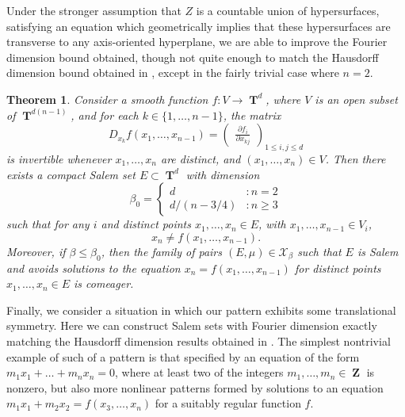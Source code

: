 \documentclass[dvipsnames,letterpaper,12pt]{article}
\numberwithin{equation}{section}
\DeclareMathOperator{\ZZ}{\mathbf{Z}}
\DeclareMathOperator{\TT}{\mathbf{T}}
\newtheorem{theorem}{Theorem}
\numberwithin{theorem}{section}
\begin{document}
Under the stronger assumption that $Z$ is a countable union of hypersurfaces, satisfying an equation which geometrically implies that these hypersurfaces are transverse to any axis-oriented hyperplane, we are able to improve the Fourier dimension bound obtained, though not quite enough to match the Hausdorff dimension bound obtained in \cite{PramanikFraser}, except in the fairly trivial case where $n = 2$.

\begin{theorem} \label{theoremJOICVIOJVI122}
    Consider a smooth function $f: V \to \TT^d$, where $V$ is an open subset of $\TT^{d(n-1)}$, and for each $k \in \{ 1, \dots, n-1 \}$, the matrix
    \[ D_{x_k} f(x_1,\dots,x_{n-1}) = \begin{pmatrix} \frac{\partial f_i}{\partial x_{kj}} \end{pmatrix}_{1 \leq i,j \leq d} \]
    is invertible whenever $x_1,\dots,x_n$ are distinct, and $(x_1,\dots,x_n) \in V$. Then there exists a compact Salem set $E \subset \TT^d$ with dimension
    \[ \beta_0 = \begin{cases} d &: n = 2 \\ d/(n - 3/4) &: n \geq 3 \end{cases} \]
    such that for any $i$ and distinct points $x_1, \dots, x_n \in E$, with $x_1,\dots,x_{n-1} \in V_i$,
    \[ x_n \neq f(x_1,\dots,x_{n-1}). \]
    Moreover, if $\beta \leq \beta_0$, then the family of pairs $(E,\mu) \in \mathcal{X}_\beta$ such that $E$ is Salem and avoids solutions to the equation $x_n = f(x_1,\dots,x_{n-1})$ for distinct points $x_1,\dots,x_n \in E$ is comeager.
\end{theorem}

Finally, we consider a situation in which our pattern exhibits some translational symmetry. Here we can construct Salem sets with Fourier dimension exactly matching the Hausdorff dimension results obtained in \cite{OurPaper}. The simplest nontrivial example of such of a pattern is that specified by an equation of the form $m_1x_1 + \dots + m_nx_n = 0$, where at least two of the integers $m_1,\dots,m_n \in \ZZ$ is nonzero, but also more nonlinear patterns formed by solutions to an equation $m_1x_1 + m_2x_2 = f(x_3,\dots,x_n)$ for a suitably regular function $f$.
\end{document}
